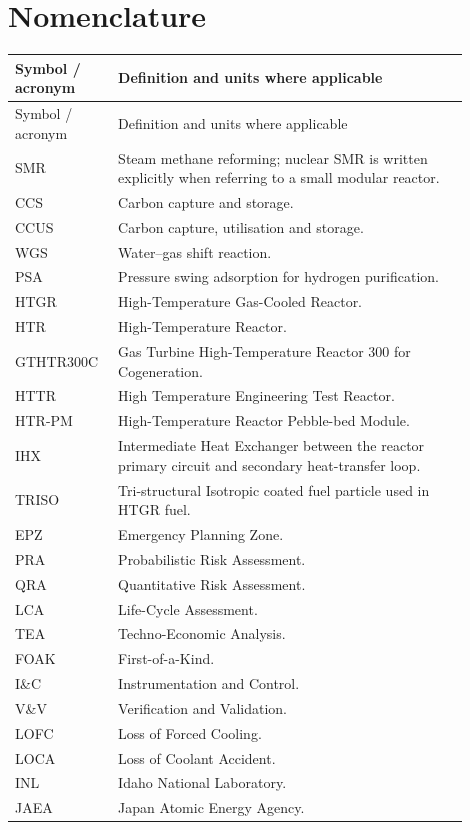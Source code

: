 \section*{Nomenclature}
\begin{longtable}{p{0.18\linewidth}p{0.72\linewidth}}
\toprule
Symbol / acronym & Definition and units where applicable \\
\midrule
\endfirsthead
\toprule
Symbol / acronym & Definition and units where applicable \\
\midrule
\endhead
SMR & Steam methane reforming; nuclear SMR is written explicitly when referring to a small modular reactor. \\
CCS & Carbon capture and storage. \\
CCUS & Carbon capture, utilisation and storage. \\
WGS & Water--gas shift reaction. \\
PSA & Pressure swing adsorption for hydrogen purification. \\
HTGR & High-Temperature Gas-Cooled Reactor. \\
HTR & High-Temperature Reactor. \\
GTHTR300C & Gas Turbine High-Temperature Reactor 300 for Cogeneration. \\
HTTR & High Temperature Engineering Test Reactor. \\
HTR-PM & High-Temperature Reactor Pebble-bed Module. \\
IHX & Intermediate Heat Exchanger between the reactor primary circuit and secondary heat-transfer loop. \\
TRISO & Tri-structural Isotropic coated fuel particle used in HTGR fuel. \\
EPZ & Emergency Planning Zone. \\
PRA & Probabilistic Risk Assessment. \\
QRA & Quantitative Risk Assessment. \\
LCA & Life-Cycle Assessment. \\
TEA & Techno-Economic Analysis. \\
FOAK & First-of-a-Kind. \\
I\&C & Instrumentation and Control. \\
V\&V & Verification and Validation. \\
LOFC & Loss of Forced Cooling. \\
LOCA & Loss of Coolant Accident. \\
INL & Idaho National Laboratory. \\
JAEA & Japan Atomic Energy Agency. \\

\end{longtable}
